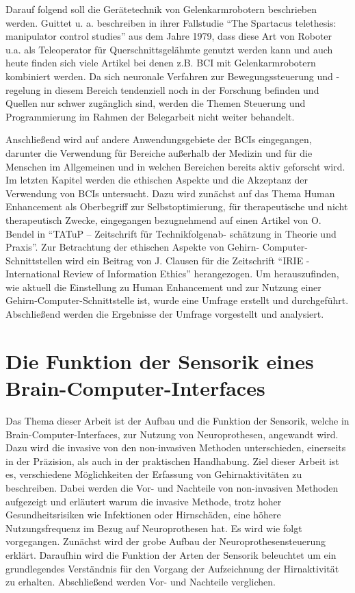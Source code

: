 \documentclass[11pt,ngerman,parskip=half]{scrartcl}
\begin{document}
Darauf folgend soll
die Gerätetechnik von Gelenkarmrobotern beschrieben werden. Guittet u. a.
beschreiben in ihrer Fallstudie \enquote{The Spartacus telethesis: manipulator
control studies} aus dem Jahre 1979, dass diese Art von Roboter u.a. als
Teleoperator für Querschnittsgelähmte genutzt werden kann und auch heute
finden sich viele Artikel bei denen z.B. BCI mit Gelenkarmrobotern kombiniert
werden. Da sich neuronale Verfahren zur Bewegungssteuerung und -regelung in
diesem Bereich tendenziell noch in der Forschung befinden und Quellen nur
schwer zugänglich sind, werden die Themen Steuerung und Programmierung im
Rahmen der Belegarbeit nicht weiter behandelt.

Anschließend wird auf andere
Anwendungsgebiete der BCIs eingegangen, darunter die Verwendung für Bereiche
außerhalb der Medizin und für die Menschen im Allgemeinen und in welchen
Bereichen bereits aktiv geforscht wird. Im letzten Kapitel werden die
ethischen Aspekte und die Akzeptanz der Verwendung von BCIs untersucht. Dazu
wird zunächst auf das Thema Human Enhancement als Oberbegriff zur
Selbstoptimierung, für therapeutische und nicht therapeutisch Zwecke,
eingegangen bezugnehmend auf einen Artikel von O. Bendel in \enquote{TATuP –
Zeitschrift für Technikfolgenab- schätzung in Theorie und Praxis}. Zur
Betrachtung der ethischen Aspekte von Gehirn- Computer-Schnittstellen wird
ein Beitrag von J. Clausen für die Zeitschrift \enquote{IRIE - International Review
of Information Ethics} herangezogen. Um herauszufinden, wie aktuell die
Einstellung zu Human Enhancement und zur Nutzung einer
Gehirn-Computer-Schnittstelle ist, wurde eine Umfrage erstellt und
durchgeführt. Abschließend werden die Ergebnisse der Umfrage vorgestellt und
analysiert.

\pagebreak
\section{Die Funktion der Sensorik eines Brain-Computer-Interfaces}
Das Thema dieser Arbeit ist der Aufbau und die Funktion der Sensorik, welche
in Brain-Computer-Interfaces, zur Nutzung von Neuroprothesen, angewandt wird.
Dazu wird die invasive von den non-invasiven Methoden unterschieden,
einerseits in der Präzision, als auch in der praktischen Handhabung. Ziel
dieser Arbeit ist es, verschiedene Möglichkeiten der Erfassung von
Gehirnaktivitäten zu beschreiben. Dabei werden die Vor- und Nachteile von
non-invasiven Methoden aufgezeigt und erläutert warum die invasive Methode,
trotz hoher Gesundheitsrisiken wie Infektionen oder Hirnschäden, eine höhere
Nutzungsfrequenz im Bezug auf Neuroprothesen hat. Es wird wie folgt
vorgegangen. Zunächst wird der grobe Aufbau der Neuroprothesensteuerung
erklärt. Daraufhin wird die Funktion der Arten der Sensorik beleuchtet um ein
grundlegendes Verständnis für den Vorgang der Aufzeichnung der Hirnaktivität
zu erhalten. Abschließend werden Vor- und Nachteile verglichen.
\end{document}

